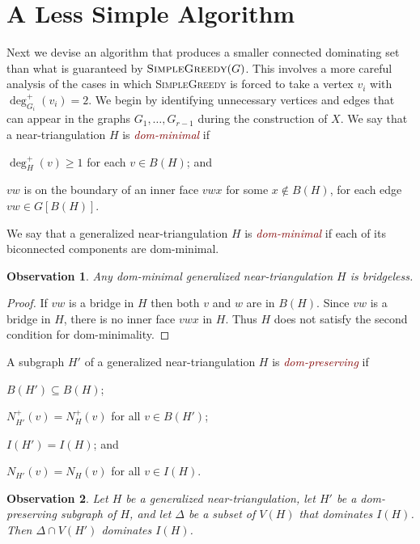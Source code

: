 \documentclass[12pt]{article}
\newtheorem{obs}{Observation}
\newcommand{\defin}[1]{\emph{\textcolor{Maroon}{#1}}}
\begin{document}
\section{A Less Simple Algorithm}

Next we devise an algorithm that produces a smaller connected dominating set than what is guaranteed by $\textsc{SimpleGreedy}(G)$.  This involves a more careful analysis of the cases in which \textsc{SimpleGreedy} is forced to take a vertex $v_i$ with $\deg^+_{G_i}(v_i)=2$.  We begin by identifying unnecessary vertices and edges that can appear in the graphs $G_1,\ldots,G_{r-1}$ during the construction of $X$.   We say that a near-triangulation $H$ is \defin{dom-minimal} if
\begin{compactenum}[({DM}1)]
    \item $\deg^+_H(v)\ge 1$ for each $v\in B(H)$; and \label{bad_vertex} 
    \item $vw$ is on the boundary of an inner face $vwx$ for some $x\not\in B(H)$, for each edge $vw\in G[B(H)]$. \label{bad_edge}
\end{compactenum}
We say that a generalized near-triangulation $H$ is \defin{dom-minimal} if each of its biconnected components are dom-minimal. 

\begin{obs}
    Any dom-minimal generalized near-triangulation $H$ is bridgeless.
\end{obs}

\begin{proof}
   If $vw$ is a bridge in $H$ then both $v$ and $w$ are in $B(H)$.  Since $vw$ is a bridge in $H$, there is no inner face $vwx$ in $H$. Thus $H$ does not satisfy the second condition for dom-minimality.
\end{proof}

A subgraph $H'$ of a generalized near-triangulation $H$ is \defin{dom-preserving} if
\begin{compactenum}[({DP}1)]
  \item $B(H')\subseteq B(H)$;
  \item $N^+_{H'}(v)=N^+_H(v)$ for all $v\in B(H')$;
  \item $I(H')=I(H)$; and 
  \item $N_{H'}(v)=N_H(v)$ for all $v\in I(H)$.
\end{compactenum} 

\begin{obs}
  Let $H$ be a generalized near-triangulation, let $H'$ be a dom-preserving subgraph of $H$, and let $\Delta$ be a subset of $V(H)$ that dominates $I(H)$.  Then $\Delta\cap V(H')$ dominates $I(H)$.    
\end{obs}
\end{document}
